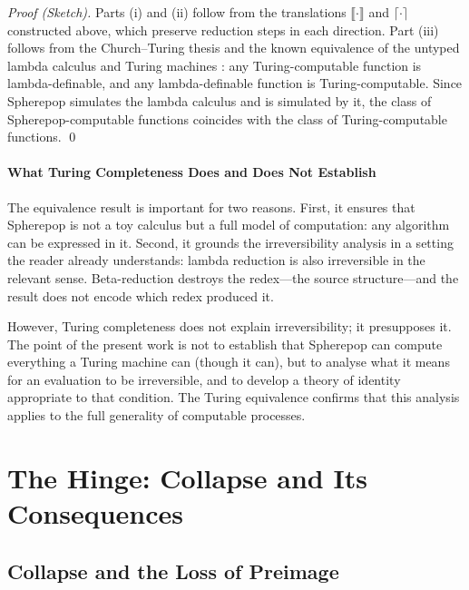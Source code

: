 \documentclass[12pt, oneside]{amsbook}
\theoremstyle{plain}
\theoremstyle{definition}
\theoremstyle{remark}
\begin{document}
\begin{proof}[Proof (Sketch)]
Parts (i) and (ii) follow from the translations $\llbracket\cdot\rrbracket$
and $\lceil\cdot\rceil$ constructed above, which preserve reduction steps in
each direction. Part (iii) follows from the Church--Turing thesis and the
known equivalence of the untyped lambda calculus and Turing machines
\cite{barendregt1984}: any Turing-computable function is lambda-definable,
and any lambda-definable function is Turing-computable. Since Spherepop
simulates the lambda calculus and is simulated by it, the class of
Spherepop-computable functions coincides with the class of Turing-computable
functions. \qed
\end{proof}

\subsection{What Turing Completeness Does and Does Not Establish}

The equivalence result is important for two reasons. First, it ensures that
Spherepop is not a toy calculus but a full model of computation: any
algorithm can be expressed in it. Second, it grounds the irreversibility
analysis in a setting the reader already understands: lambda reduction is
also irreversible in the relevant sense. Beta-reduction destroys the
redex---the source structure---and the result does not encode which redex
produced it.

However, Turing completeness does not explain irreversibility; it presupposes
it. The point of the present work is not to establish that Spherepop can
compute everything a Turing machine can (though it can), but to analyse what
it means for an evaluation to be irreversible, and to develop a theory of
identity appropriate to that condition. The Turing equivalence confirms that
this analysis applies to the full generality of computable processes.

\part{The Hinge: Collapse and Its Consequences}

\chapter{Collapse and the Loss of Preimage}
\label{ch:collapse}
\end{document}
